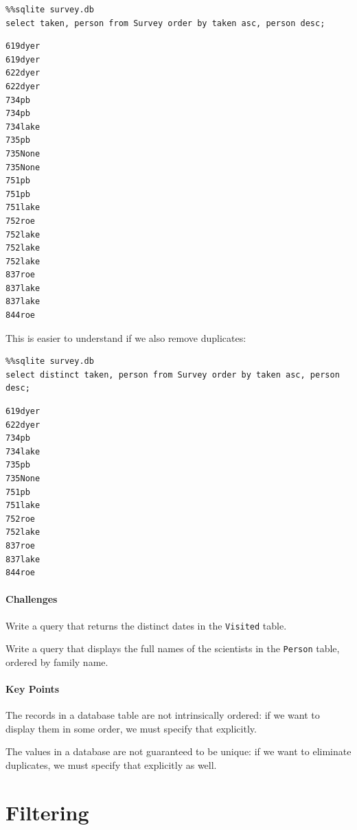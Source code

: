 \documentclass{book}
\begin{document}
\begin{verbatim}
%%sqlite survey.db
select taken, person from Survey order by taken asc, person desc;
\end{verbatim}

\begin{verbatim}
619dyer
619dyer
622dyer
622dyer
734pb
734pb
734lake
735pb
735None
735None
751pb
751pb
751lake
752roe
752lake
752lake
752lake
837roe
837lake
837lake
844roe
\end{verbatim}

This is easier to understand if we also remove duplicates:

\begin{verbatim}
%%sqlite survey.db
select distinct taken, person from Survey order by taken asc, person desc;
\end{verbatim}

\begin{verbatim}
619dyer
622dyer
734pb
734lake
735pb
735None
751pb
751lake
752roe
752lake
837roe
837lake
844roe
\end{verbatim}

\mbox{}\paragraph{Challenges}

\begin{swcenumerate}
\item
  Write a query that returns the distinct dates in the \texttt{Visited}
  table.
\item
  Write a query that displays the full names of the scientists in the
  \texttt{Person} table, ordered by family name.
\end{swcenumerate}

\mbox{}\paragraph{Key Points}

\begin{swcitemize}
\item
  The records in a database table are not intrinsically ordered: if we
  want to display them in some order, we must specify that explicitly.
\item
  The values in a database are not guaranteed to be unique: if we want
  to eliminate duplicates, we must specify that explicitly as well.
\end{swcitemize}

\section{Filtering}
\end{document}
